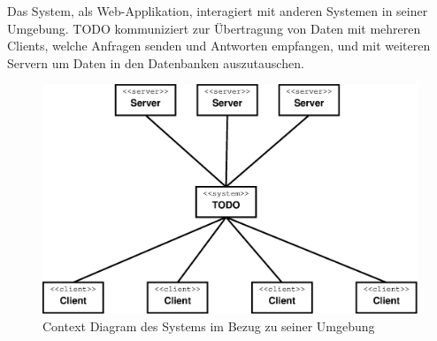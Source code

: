Das System, als Web-Applikation, interagiert mit anderen Systemen in seiner Umgebung. TODO kommuniziert zur Übertragung von Daten mit mehreren Clients, welche Anfragen senden und Antworten empfangen, und mit weiteren Servern um Daten in den Datenbanken auszutauschen.
\begin{figure}[h]
\centering
\includegraphics[width=0.9\linewidth]{Grafik/Diagramm/External}
\caption[Context Diagram]{Context Diagram des Systems im Bezug zu seiner Umgebung}
\label{fig:External}
\end{figure}

